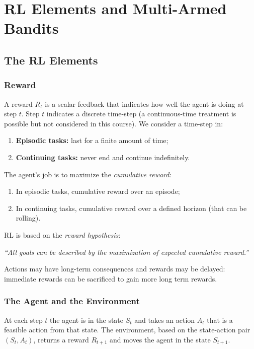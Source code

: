 \chapter{RL Elements and Multi-Armed Bandits}

\section{The RL Elements}
\subsection{Reward}
A reward $R_t$ is a scalar feedback that indicates how well the agent is doing at step $t$.
Step $t$ indicates a discrete time-step (a continuous-time treatment is possible but not considered in this course).
We consider a time-step in:
\begin{enumerate}
    \item \textbf{Episodic tasks:} last for a finite amount of time;
    \item \textbf{Continuing tasks:} never end and continue indefinitely.
\end{enumerate}
The agent's job is to maximize the \textit{cumulative reward}:
\begin{enumerate}
    \item In episodic tasks, cumulative reward over an episode;
    \item In continuing tasks, cumulative reward over a defined horizon (that can be rolling).
\end{enumerate}
RL is based on the \textit{reward hypothesis}:
\begin{center}
  \itshape ``All goals can be described by the maximization of expected cumulative reward.''
\end{center}
Actions may have long-term consequences and rewards may be delayed: immediate rewards can be sacrificed to gain more long term rewards.

\subsection{The Agent and the Environment}
At each step $t$ the agent is in the state $S_t$ and takes an action $A_t$ that is a feasible action from that state. The environment, based on the state-action pair $(S_t, A_t)$, returns a reward $R_{t+1}$ and moves the agent in the state $S_{t+1}$.

